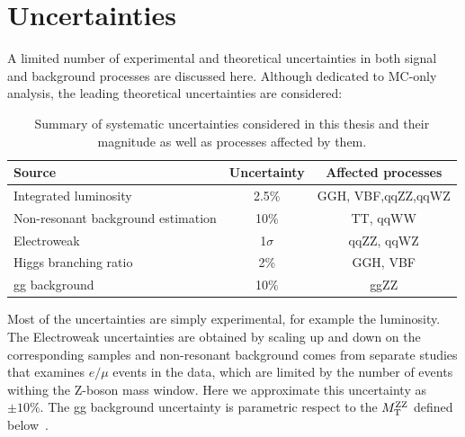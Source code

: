 \section{Uncertainties}
A limited number of experimental and theoretical uncertainties in both signal and background
processes are discussed here. Although dedicated to MC-only analysis, the leading theoretical
uncertainties are considered:
\begin{table}[hbt]
    \label{tab:uncertainty}
    \centering
\begin{tabular}{lcc}
\hline
Source                             & Uncertainty            & Affected processes \\ \hline
Integrated luminosity              & 2.5\%                  & GGH, VBF,qqZZ,qqWZ \\
Non-resonant background estimation & 10\%                   & TT, qqWW           \\
Electroweak                       & 1$\sigma$ & qqZZ, qqWZ         \\
Higgs branching ratio              & 2\%                    & GGH, VBF           \\
gg background              & 10\%                   & ggZZ
\end{tabular}
\caption{Summary of systematic uncertainties considered in this thesis and their
magnitude as well as processes affected by them.}
\label{tab:systs}
\end{table}

Most of the uncertainties are simply experimental, for example the luminosity. The Electroweak
uncertainties are obtained by scaling up and down on the corresponding samples and non-resonant
background comes from separate studies that examines $e/\mu$ events in the data, which
are limited by the number of events withing the Z-boson mass window. Here we approximate this 
uncertainty as $\pm 10\%$.  The gg background uncertainty is parametric respect to the $M_\mathrm{T}^{\mathrm{ZZ}}$ defined 
below~\cite{campbell_two_2016, caola_qcd_2015, caola_qcd_2015}.
